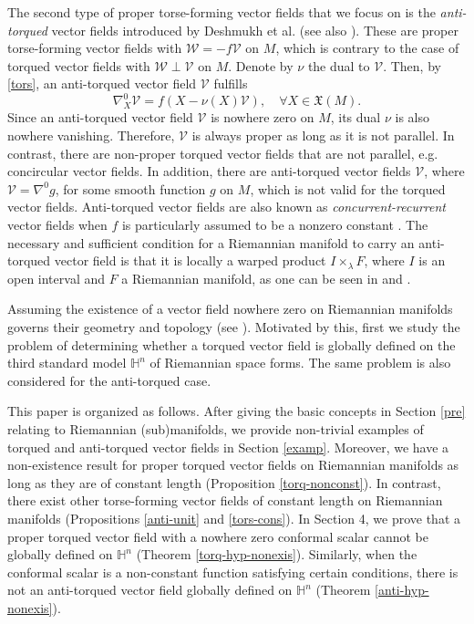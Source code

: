 \documentclass[12pt]{amsart}
\def\h{\mathbb H}
\theoremstyle{definition}
\begin{document}
The second type of proper torse-forming vector fields that we focus on is the {\it anti-torqued} vector fields introduced by Deshmukh et al. \cite{dan} (see also \cite{cs}). These are proper torse-forming vector fields with $\mathcal{W}=-f\mathcal{V}$ on $M$, which is contrary to the case of torqued vector fields with $\mathcal{W} \perp \mathcal{V}$ on $M$. Denote by $\nu$ the dual to $\mathcal{V}$. Then, by \eqref{tors}, an anti-torqued vector field $\mathcal{V}$ fulfills
\begin{equation}\label{a-tor}
\nabla^0_X \mathcal{V}=f (X - \nu (X)\mathcal{V}), \quad \forall X\in \mathfrak{X}(M).
\end{equation}
Since an anti-torqued vector field $\mathcal{V}$ is nowhere zero on $M$, its dual $\nu$ is also nowhere vanishing. Therefore, $\mathcal{V}$ is always proper as long as it is not parallel. In contrast, there are non-proper torqued vector fields that are not parallel, e.g. concircular vector fields. In addition, there are anti-torqued vector fields $\mathcal{V}$, where $\mathcal{V}=\nabla^0 g$, for some smooth function $g$ on $M$, which is not valid for the torqued vector fields. Anti-torqued vector fields are also known as {\it concurrent-recurrent} vector fields when $f$ is particularly assumed to be a nonzero constant \cite{na}. The necessary and sufficient condition for a Riemannian manifold to carry an anti-torqued vector field is that it is locally a warped product $I \times_\lambda F$, where $I$ is an open interval and $F$ a Riemannian manifold, as one can be seen in \cite[Theorem 3.1]{amc} and \cite[Theorem 3]{na}. 

Assuming the existence of a vector field nowhere zero on Riemannian manifolds governs their geometry and topology (see \cite{amc,dk,dan,dta,dmtv,id}). Motivated by this, first we study the problem of determining whether a torqued vector field is globally defined on the third standard model $\h^n$ of Riemannian space forms. The same problem is also considered for the anti-torqued case.  


This paper is organized as follows. After giving the basic concepts in Section \ref{pre} relating to Riemannian (sub)manifolds, we provide non-trivial examples of torqued and anti-torqued vector fields in Section \ref{examp}. Moreover, we have a non-existence result for proper torqued vector fields on Riemannian manifolds as long as they are of constant length (Proposition \ref{torq-nonconst}). In contrast, there exist other torse-forming vector fields of constant length on Riemannian manifolds (Propositions \ref{anti-unit} and \ref{tors-cons}). In Section 4, we prove that a proper torqued vector field with a nowhere zero conformal scalar cannot be globally defined on $\h^n$ (Theorem \ref{torq-hyp-nonexis}). Similarly, when the conformal scalar is a non-constant function satisfying certain conditions, there is not an anti-torqued vector field globally defined on $\h^n$  (Theorem \ref{anti-hyp-nonexis}).
\end{document}
